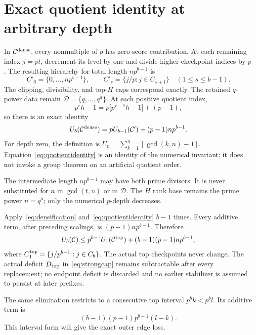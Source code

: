 \documentclass[11pt,letterpaper]{article}
\theoremstyle{definition}\newtheorem{definition}{Definition}
\newcommand{\D}{\mathcal D}
\newcommand{\C}{\mathcal C}
\begin{document}
\section{Exact quotient identity at arbitrary depth}\label{sec:quotient}
In $\C^{\rm dense}$, every nonmultiple of $p$ has zero score contribution. At each remaining index $j=pt$, decrement its level by one and divide higher checkpoint indices by $p$. The resulting hierarchy for total length $np^{b-1}$ is
\begin{equation}
C'_0=\{0,\ldots,np^{b-1}\},\qquad
C'_s=\{j/p:j\in C_{s+1}\}\quad(1\le s\le b-1).\label{eq:quotient}
\end{equation}
The clipping, divisibility, and top-$H$ caps correspond exactly. The retained $q$-power data remain $\D=\{q,\ldots,q^a\}$. At each positive quotient index,
\[
p^rh-1=p\bigl[p^{r-1}h-1\bigr]+(p-1),
\]
so there is an exact identity
\begin{equation}
U_b(\C^{\rm dense})=pU_{b-1}(\C')+(p-1)np^{b-1}.\label{eq:quotientidentity}
\end{equation}
For depth zero, the definition is $U_0=\sum_{k=1}^{n}[\gcd(k,n)-1]$. Equation~\eqref{eq:quotientidentity} is an identity of the numerical invariant; it does not invoke a group theorem on an artificial quotient order.

The intermediate length $np^{b-1}$ may have both prime divisors. It is never substituted for $n$ in $\gcd(t,n)$ or in $\D$. The $H$ rank base remains the prime power $n=q^a$; only the numerical $p$-depth decreases.

Apply~\eqref{eq:densification} and~\eqref{eq:quotientidentity} $b-1$ times. Every additive term, after preceding scalings, is $(p-1)np^{b-1}$. Therefore
\begin{equation}
U_b(\C)\le p^{b-1}U_1(\C^{\rm top})+(b-1)(p-1)np^{b-1},\label{eq:collapse}
\end{equation}
where $C^{\rm top}_1=\{j/p^{b-1}:j\in C_b\}$. The actual top checkpoints never change. The actual deficit $D_{\rm top}$ in~\eqref{eq:strongcap} remains subtractable after every replacement; no endpoint deficit is discarded and no earlier stabilizer is assumed to persist at later prefixes.

The same elimination restricts to a consecutive top interval $p^bk<p^bl$. Its additive term is
\[
(b-1)(p-1)p^{b-1}(l-k).
\]
This interval form will give the exact outer edge loss.
\end{document}
